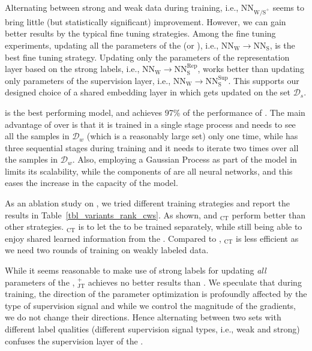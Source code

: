 Alternating between strong and weak data during training, i.e., $\text{NN}_{\text{W}\text{/S}^+}$ seems to bring little (but statistically significant) improvement. However, we can gain better results by the typical fine tuning strategies.  Among the fine tuning experiments, updating all the parameters of the \tnet (or \std), i.e., $\text{NN}_{\text{W}} \to \text{NN}_{\text{S}}$, is the best fine tuning strategy. Updating only the parameters of the representation layer based on the strong labels, i.e., $\text{NN}_{\text{W}} \to \text{NN}^{\text{Rep}}_{\text{S}}$, works better than updating only parameters of the supervision layer, i.e., $\text{NN}_{\text{W}} \to \text{NN}^{\text{Sup}}_{\text{S}}$. This supports our designed choice of a shared embedding layer in \cws which gets updated on the set $\mathcal{D}_s$.

\fwl is the best performing model, and \cws achieves 97\% of the performance of \fwl. The main advantage of \cws over \fwl is that it is trained in a single stage process and needs to see all the samples in $\mathcal{D}_w$ (which is a reasonably large set) only one time, while \fwl has three sequential stages during training and it needs to iterate two times over all the samples in $\mathcal{D}_w$. Also, employing a Gaussian Process as part of the model in \fwl limits its scalability, while the components of \cws are all neural networks, and this eases the increase in the capacity of the model. 



As an ablation study on \cws, we tried different training strategies and report the results in Table~\ref{tbl_variants_rank_cws}. As shown, \cws and \cwsnospace$_\text{CT}$ perform better than other strategies.
%
\cwsnospace$_\text{CT}$ is to let the \cnet to be trained separately, while still being able to enjoy shared learned information from the \tnet. Compared to \cws, \cwsnospace$_\text{CT}$ is less efficient as we need two rounds of training on weakly labeled data. 

While it seems reasonable to make use of strong labels for updating \emph{all} parameters of the \tnet, \cwsnospace$_\text{JT}^+$ achieves no better results than \cws. We speculate that during training, the direction of the parameter optimization is profoundly affected by the type of supervision signal and while we control the magnitude of the gradients, we do not change their directions. Hence alternating between two sets with different label qualities (different supervision signal types, i.e., weak and strong) confuses the supervision layer of the \tnet. 

